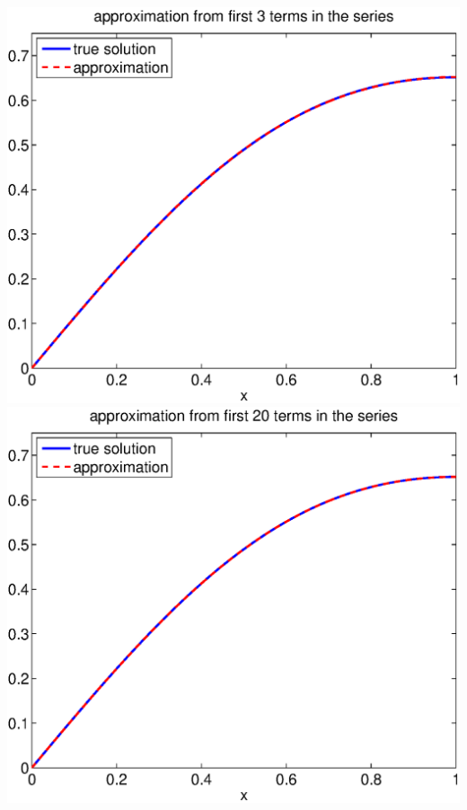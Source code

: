 \begin{solution}
\begin{enumerate}
\begin{center}
   \includegraphics[scale=0.4]{bvps_3}\quad
   \includegraphics[scale=0.4]{bvps_20}
\end{center}




\end{enumerate}
\end{solution}
